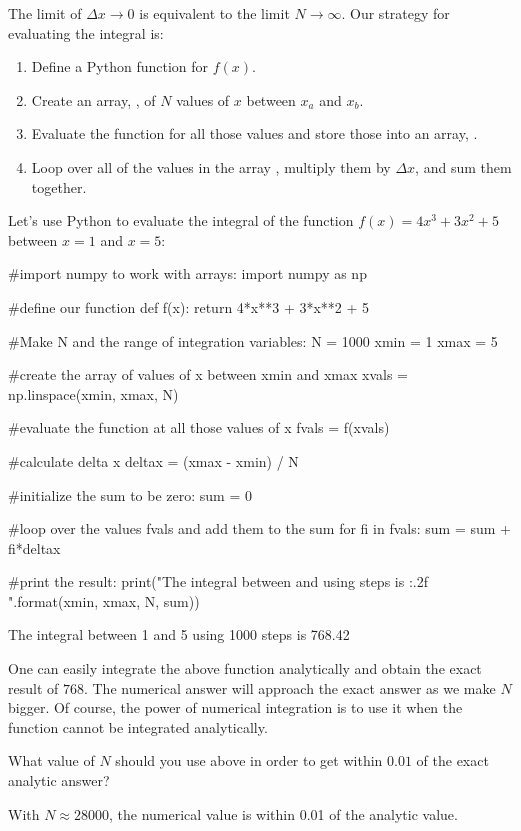 The limit of $\Delta x \to 0$ is equivalent to the limit $N \to \infty$. Our strategy for evaluating the integral is:
\begin{enumerate}
\item Define a Python function for $f(x)$.
\item Create an array, , of $N$ values of $x$ between $x_a$ and $x_b$.
\item Evaluate the function for all those values and store those into an array, .
\item Loop over all of the values in the array , multiply them by $\Delta x$, and sum them together.
\end{enumerate}
Let's use Python to evaluate the integral of the function $f(x)=4x^3+3x^2+5$ between $x=1$ and $x=5$:
\begin{python}[caption=Numerical integration of a function] 
#import numpy to work with arrays:
import numpy as np

#define our function
def f(x):
  return 4*x**3 + 3*x**2 + 5
  
#Make N and the range of integration variables:
N = 1000
xmin = 1
xmax = 5

#create the array of values of x between xmin and xmax
xvals = np.linspace(xmin, xmax, N)

#evaluate the function at all those values of x
fvals = f(xvals)

#calculate delta x
deltax = (xmax - xmin) / N

#initialize the sum to be zero:
sum = 0

#loop over the values fvals and add them to the sum
for fi in fvals:
  sum = sum + fi*deltax

#print the result:
print("The integral between {} and {} using {} steps is {:.2f} ".format(xmin, xmax, N, sum))

\end{python}
\begin{poutput}
The integral between 1 and 5 using 1000 steps is 768.42 
\end{poutput}
One can easily integrate the above function analytically and obtain the exact result of $\num{768}$. The numerical answer will approach the exact answer as we make $N$ bigger. Of course, the power of numerical integration is to use it when the function cannot be integrated analytically.

\begin{checkpoint}{What value of $N$ should you use above in order to get within $\num{0.01}$ of the exact analytic answer?}
\begin{answer}
With $N\approx 28000$, the numerical value is within 0.01 of the analytic value.
\end{answer}
\end{checkpoint}


